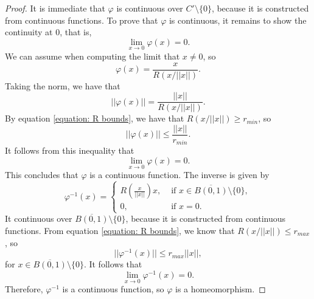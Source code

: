 \documentclass[10pt,a4paper]{amsart}
\begin{document}
\begin{proof}
	It is immediate that $\varphi$ is continuous over $C' \setminus \{0\}$, because it is constructed from continuous functions. To prove that $\varphi$ is continuous, it remains to show the continuity at 0, that is,
	\begin{equation}
		\lim_{x \to 0} \varphi(x) = 0.
	\end{equation}
	We can assume when computing the limit that $x \neq 0$, so
	\begin{equation}
		\varphi(x) = \frac{x}{R(x/||x||)}.
	\end{equation}
	Taking the norm, we have that
	\begin{equation}
		||\varphi(x)|| = \frac{||x||}{R(x/||x||)}.
	\end{equation}
	By equation \ref{equation: R bounds}, we have that $R(x/||x||) \geq r_{min}$, so
	\begin{equation}
		||\varphi(x)|| \leq \frac{||x||}{r_{min}}.
	\end{equation}
	It follows from this inequality that
	\begin{equation}
		\lim_{x \to 0} \varphi(x) = 0.
	\end{equation}
	This concludes that $\varphi$ is a continuous function. The inverse is given by
	\begin{equation}
		\varphi^{-1}(x) = \begin{cases}
			R\left(\frac{x}{||x||}\right) x, &\text{ if } x \in \overline{B(0,1)} \setminus \{0\}, \\
			0, &\text{ if } x = 0.
		\end{cases}
	\end{equation}
	It continuous over $\overline{B(0,1)} \setminus \{0\}$, because it is constructed from continuous functions. From equation \ref{equation: R bounds}, we know that $R(x/||x||) \leq r_{max}$, so
	\begin{equation}
		||\varphi^{-1}(x)|| \leq r_{max} ||x||,
	\end{equation}
	for $x \in \overline{B(0,1)} \setminus \{0\}$. It follows that
	\begin{equation}
		\lim_{x \to 0} \varphi^{-1} (x) = 0.
	\end{equation}
	Therefore, $\varphi^{-1}$ is a continuous function, so $\varphi$ is a homeomorphism.
\end{proof}
\end{document}
